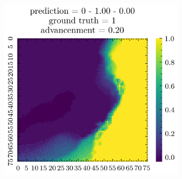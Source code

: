 \documentclass[../document.tex]{subfiles}
\begin{document}
\begin{figure}[H]
\begin{subfigure}[b]{0.19\textwidth}
    \end{subfigure}  
    \begin{subfigure}[b]{0.19\textwidth}
        \includegraphics[width=\linewidth]{../img/5/quarry/false_positive/patch-2d-4.png}
    \end{subfigure}  


\end{figure}
\end{document}
